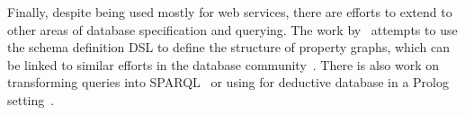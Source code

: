 Finally, despite being used mostly for web services, there are efforts to extend \gql to other areas of database specification and querying. The work by~\cite{olafschema} attempts to use the schema definition DSL to define the structure of property graphs,
which can be linked to similar efforts in the database community~\cite{schemaval, gcore}. There is also work on transforming \gql queries into SPARQL~\cite{gqlsparql} or using \gql for deductive database in a Prolog setting~\cite{gqldeductive}. 

